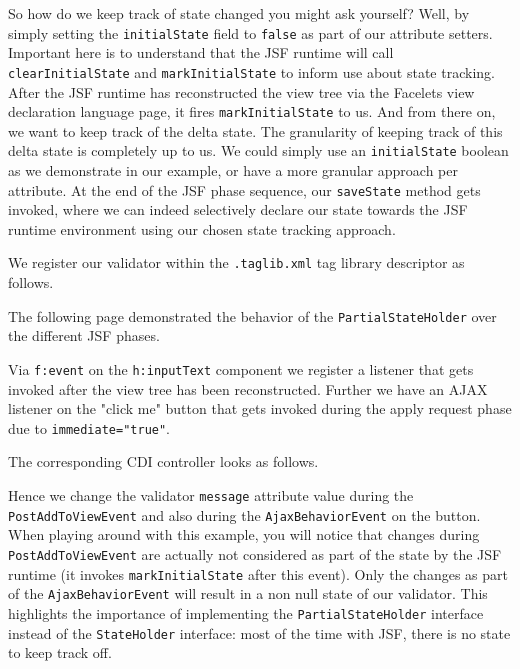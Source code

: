 So how do we keep track of state changed you might ask yourself?
Well, by simply setting the \texttt{initialState} field to \texttt{false} as part of our attribute setters.
Important here is to understand that the JSF runtime will call \texttt{clearInitialState} and \texttt{markInitialState} to inform use about state tracking.
After the JSF runtime has reconstructed the view tree via the Facelets view declaration language page, it fires \texttt{markInitialState} to us.
And from there on, we want to keep track of the delta state.
The granularity of keeping track of this delta state is completely up to us.
We could simply use an \texttt{initialState} boolean as we demonstrate in our example, or have a more granular approach per attribute.
At the end of the JSF phase sequence, our \texttt{saveState} method gets invoked, where we can indeed selectively declare our state towards the JSF runtime environment using our chosen state tracking approach.

We register our validator within the \texttt{.taglib.xml} tag library descriptor as follows.


The following page demonstrated the behavior of the \texttt{PartialStateHolder} over the different JSF phases.

Via \texttt{f:event} on the \texttt{h:inputText} component we register a listener that gets invoked after the view tree has been reconstructed.
Further we have an AJAX listener on the "click me" button that gets invoked during the apply request phase due to \texttt{immediate="true"}.

The corresponding CDI controller looks as follows.

Hence we change the validator \texttt{message} attribute value during the \texttt{PostAddToViewEvent} and also during the \texttt{AjaxBehaviorEvent} on the button.
When playing around with this example, you will notice that changes during \texttt{PostAddToViewEvent} are actually not considered as part of the state by the JSF runtime (it invokes \texttt{markInitialState} after this event).
Only the changes as part of the \texttt{AjaxBehaviorEvent} will result in a non null state of our validator.
This highlights the importance of implementing the \texttt{PartialStateHolder} interface instead of the \texttt{StateHolder} interface:
most of the time with JSF, there is no state to keep track off.

